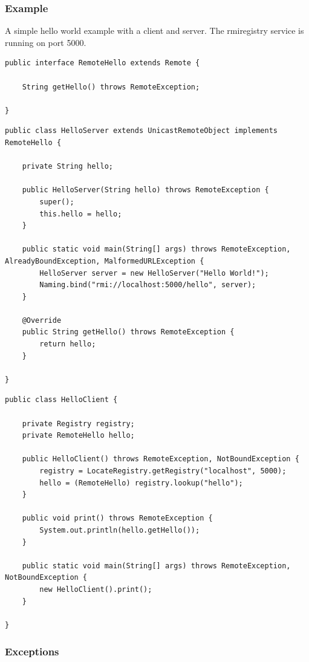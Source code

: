 \documentclass[a4paper]{article}
\begin{document}
\subsubsection{Example}

A simple hello world example with a client and server. The rmiregistry service is running on port 5000.

\begin{lstlisting}
public interface RemoteHello extends Remote {

    String getHello() throws RemoteException;

}
\end{lstlisting}

\begin{lstlisting}
public class HelloServer extends UnicastRemoteObject implements RemoteHello {

    private String hello;

    public HelloServer(String hello) throws RemoteException {
        super();
        this.hello = hello;
    }

    public static void main(String[] args) throws RemoteException, AlreadyBoundException, MalformedURLException {
        HelloServer server = new HelloServer("Hello World!");
        Naming.bind("rmi://localhost:5000/hello", server);
    }

    @Override
    public String getHello() throws RemoteException {
        return hello;
    }

}
\end{lstlisting}

\begin{lstlisting}
public class HelloClient {

    private Registry registry;
    private RemoteHello hello;

    public HelloClient() throws RemoteException, NotBoundException {
        registry = LocateRegistry.getRegistry("localhost", 5000);
        hello = (RemoteHello) registry.lookup("hello");
    }

    public void print() throws RemoteException {
        System.out.println(hello.getHello());
    }

    public static void main(String[] args) throws RemoteException, NotBoundException {
        new HelloClient().print();
    }

}
\end{lstlisting}

\subsubsection{Exceptions}
\end{document}
